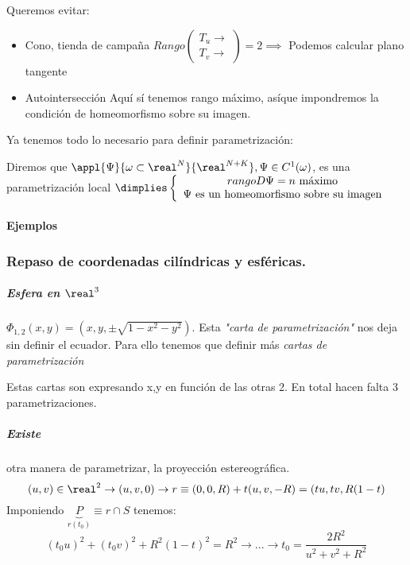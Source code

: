 Queremos evitar:

\begin{itemize}
\item Cono, tienda de campaña
$Rango \begin{pmatrix}
T_u \rightarrow\\
T_v \rightarrow
\end{pmatrix} = 2 \implies $ Podemos calcular plano tangente
\item Autointersección
Aquí sí tenemos rango máximo, asíque impondremos la condición de homeomorfismo sobre su imagen.
\end{itemize}

Ya tenemos todo lo necesario para definir parametrización:

\begin{defn}
Diremos que $\appl{\Psi}{\omega \subset \real^N}{\real^{N+K}}, \Psi \in C^1(\omega)$, es una parametrización local $\dimplies \left\{ \begin{array}{c}
 rango D\Psi = n \text{ máximo}\\
 \Psi \text{ es un homeomorfismo sobre su imagen}
\end{array}\right.$
\end{defn}



\paragraph{Ejemplos}
\subsubsection{Repaso de coordenadas cilíndricas y esféricas.}

\subparagraph{Esfera en $\real^3$}
 $\Phi_{1,2}(x,y) = (x,y,\pm \sqrt{1-x^2-y^2})$. Esta \emph{"carta de parametrización"} nos deja sin definir el ecuador. Para ello tenemos que definir más \emph{cartas de parametrización} 
 
 Estas cartas son expresando x,y en función de las otras 2. En total hacen falta 3 parametrizaciones.
 
 \subparagraph{Existe} otra manera de parametrizar, la proyección estereográfica.  
 \[(u,v) \in \real^2 \rightarrow (u,v,0) \rightarrow r\equiv (0,0,R) + t(u,v,-R) = (tu,tv,R(1-t)\]
 Imponiendo $\underbrace{P}_{r(t_0)} \equiv r\cap S$ tenemos: \[(t_0u)^2+(t_0v)^2 + R^2(1-t)^2 = R^2 \rightarrow ... \rightarrow t_0 = \frac{2R^2}{u^2+v^2+R^2}\]
 
